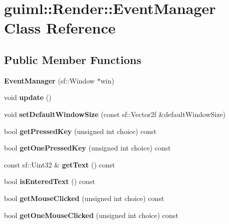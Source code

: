 \section{guiml\-:\-:Render\-:\-:Event\-Manager Class Reference}
\label{classguiml_1_1_render_1_1_event_manager}
\subsection*{Public Member Functions}
\begin{DoxyCompactItemize}
\item 
{\bfseries Event\-Manager} (sf\-::\-Window $\ast$win)\label{classguiml_1_1_render_1_1_event_manager_a958e02e00f4c7a813e3f7e66497274f2}

\item 
void {\bfseries update} ()\label{classguiml_1_1_render_1_1_event_manager_a7deed632d976cc98dd081c349453429f}

\item 
void {\bfseries set\-Default\-Window\-Size} (const sf\-::\-Vector2f \&default\-Window\-Size)\label{classguiml_1_1_render_1_1_event_manager_a0752114427a53628ea78b313ceca76c4}

\item 
bool {\bfseries get\-Pressed\-Key} (unsigned int choice) const \label{classguiml_1_1_render_1_1_event_manager_a9839386d1e7d9b000d546b70ae6ffb67}

\item 
bool {\bfseries get\-One\-Pressed\-Key} (unsigned int choice) const \label{classguiml_1_1_render_1_1_event_manager_aaa839cdbd66fd38073a0bd643578f660}

\item 
const sf\-::\-Uint32 \& {\bfseries get\-Text} () const \label{classguiml_1_1_render_1_1_event_manager_aa2b365a704ca565c7b0cc0a3b9161fbe}

\item 
bool {\bfseries is\-Entered\-Text} () const \label{classguiml_1_1_render_1_1_event_manager_a8bec5d09ba2fd94dad9f293f5296d08d}

\item 
bool {\bfseries get\-Mouse\-Clicked} (unsigned int choice) const \label{classguiml_1_1_render_1_1_event_manager_a6e5689eaa7d50f185390f45ef1d41aef}

\item 
bool {\bfseries get\-One\-Mouse\-Clicked} (unsigned int choice) const \label{classguiml_1_1_render_1_1_event_manager_a076f871ae3b48102538f4039216f72e4}


\end{DoxyCompactItemize}
